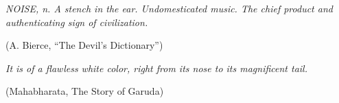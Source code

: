 \cleardoublepage
\thispagestyle{empty}
\vspace*{3cm}

\begin{flushleft}
\begin{minipage}{0.62\textwidth}
\itshape
NOISE, n. A stench in the ear. Undomesticated music. The chief product
and authenticating sign of civilization.

\vspace{0.5cm}
\normalfont
(A. Bierce, ``The Devil's Dictionary'')
\end{minipage}
\end{flushleft}

\vfill

\begin{flushright}
\begin{minipage}{0.56\textwidth}
\itshape
It is of a flawless white color, right from its nose to its magnificent
tail.

\vspace{0.5cm}
\normalfont
(Mahabharata, The Story of Garuda)
\end{minipage}
\end{flushright}

\vfill

\begin{flushright}
\ghats
\end{flushright}
\cleardoublepage
